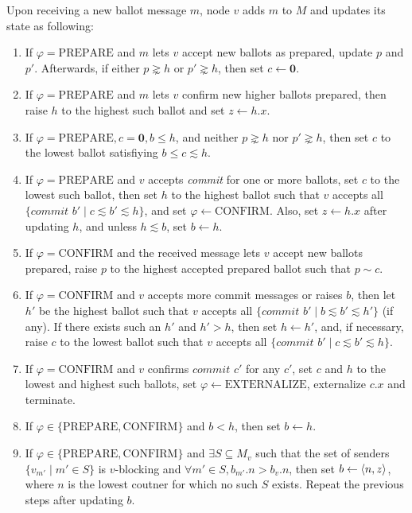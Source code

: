 \begin{defn}\label{transition_type_2}
    Upon receiving a new ballot message $m$, node $v$ adds $m$ to $M$ and updates its state as following:
    \begin{enumerate}
        \item %
            If $\varphi = \text{PREPARE}$ and $m$ lets $v$ accept new ballots as prepared, update $p$ and $p'$.
            Afterwards, if either $p \gnsim h$ or $p' \gnsim h$, then set $c \leftarrow \textbf{0}$.
        \item %
            If $\varphi = \text{PREPARE}$ and $m$ lets $v$ confirm new higher ballots prepared, then raise $h$ to the highest such ballot and set $z \leftarrow h.x$.
        \item %
            If $\varphi = \text{PREPARE}, c = \textbf{0}, b \leq h$, and neither $p \gnsim h$ nor $p' \gnsim h$, then set $c$ to the lowest ballot satisfiying $b \leq c \lesssim h$.
        \item %
            If $\varphi = \text{PREPARE}$ and $v$ accepts \textit{commit} for one or more ballots, set $c$ to the lowest such ballot, then set $h$ to the highest ballot such that $v$ accepts all $\{ \textit{commit } b' \mid c \lesssim b' \lesssim h \}$, and set $\varphi \leftarrow \text{CONFIRM}$.
            Also, set $z \leftarrow h.x$ after updating $h$, and unless $h \lesssim b$, set $b \leftarrow h$.
        \item %
            If $\varphi = \text{CONFIRM}$ and the received message lets $v$ accept new ballots prepared, raise $p$ to the highest accepted prepared ballot such that $p \sim c$.
        \item %
            If $\varphi = \text{CONFIRM}$ and $v$ accepts more commit messages or raises $b$, then let $h'$ be the highest ballot such that $v$ accepts all $\{ \textit{commit } b' \mid b \lesssim b' \lesssim h' \}$  (if any).
            If there exists such an $h'$ and $h' > h$, then set $h \leftarrow h'$, and, if necessary, raise $c$ to the lowest ballot such that $v$ accepts all $\{ \textit{commit } b' \mid c \lesssim b' \lesssim h \}$.
        \item %
            If $\varphi = \text{CONFIRM}$ and $v$ confirms $\textit{commit } c'$ for any $c'$, set $c$ and $h$ to the lowest and highest such ballots, set $\varphi \leftarrow \text{EXTERNALIZE}$, externalize $c.x$ and terminate.
        \item %
            If $\varphi \in \{ \text{PREPARE}, \text{CONFIRM} \}$ and $b < h$, then set $b \leftarrow h$.
        \item %
            If $\varphi \in \{ \text{PREPARE}, \text{CONFIRM} \}$ and $\exists S \subseteq M_v$ such that the set of senders $\{ v_{m'} \mid m' \in S \}$ is $v$-blocking and $\forall m' \in S, b_{m'}.n > b_v.n$, then set $b \leftarrow \ev{n, z}$, where $n$ is the lowest coutner for which no such $S$ exists.
            Repeat the previous steps after updating $b$.
    \end{enumerate}
\end{defn}

